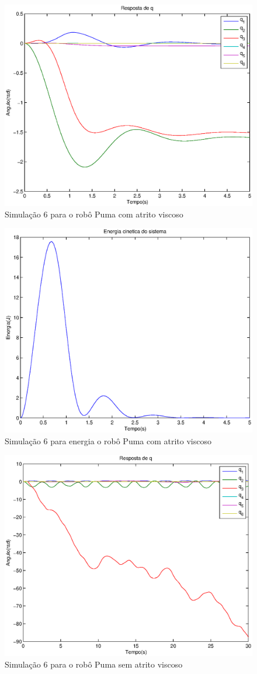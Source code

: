\documentclass{article}
\begin{document}
\begin{figure}[H]
	\centering
	\includegraphics[width=0.8\linewidth]{../sime2odea}
	\caption{Simulação 6 para o robô Puma com atrito viscoso}
	\label{fig:pumasim6}
\end{figure}

\begin{figure}[H]
	\centering
	\includegraphics[width=0.8\linewidth]{../sime1kina}
	\caption{Simulação 6 para energia o robô Puma com atrito viscoso}
	\label{fig:energysim6}
\end{figure}

\begin{figure}[H]
	\centering
	\includegraphics[width=0.8\linewidth]{../longsims/sime2ode.eps}
	\caption{Simulação 6 para o robô Puma sem atrito viscoso}
	\label{fig:pumasim6nf}
\end{figure}
\end{document}
